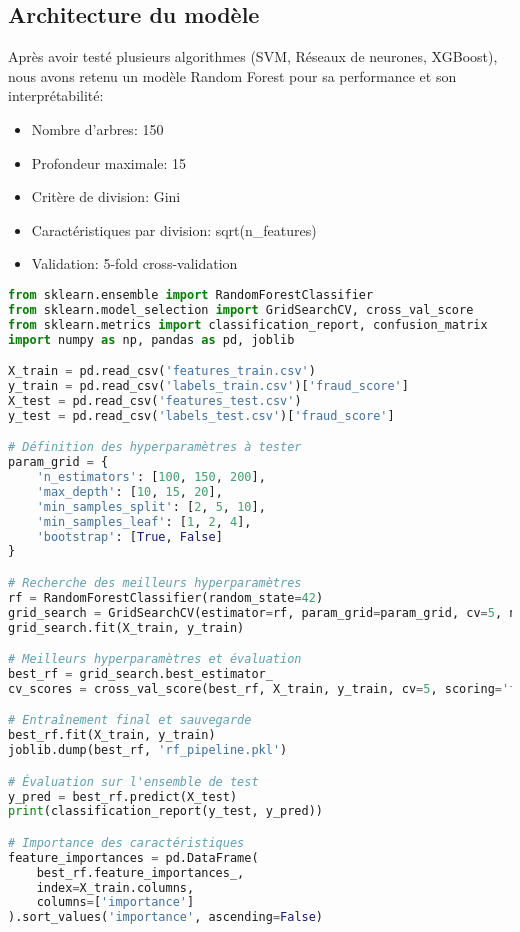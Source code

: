 \documentclass[10pt,a4paper,twocolumn]{article}
\begin{document}
\subsection{Architecture du modèle}
Après avoir testé plusieurs algorithmes (SVM, Réseaux de neurones, XGBoost), nous avons retenu un modèle Random Forest pour sa performance et son interprétabilité:

\begin{itemize}
    \item Nombre d'arbres: 150
    \item Profondeur maximale: 15
    \item Critère de division: Gini
    \item Caractéristiques par division: sqrt(n\_features)
    \item Validation: 5-fold cross-validation
\end{itemize}


\begin{lstlisting}[language=Python,
  caption=Extrait du code de l'outil de scraping,
  basicstyle=\scriptsize,
  breaklines=true,
  postbreak=\mbox{\textcolor{red}{$\hookrightarrow$}\space},
  columns=flexible,
  frame=single,              % active le cadre
  xleftmargin=4em,           % décale le texte à l'intérieur du cadre
  framexleftmargin=2em       % décale le cadre pour qu'il suive le texte
]
from sklearn.ensemble import RandomForestClassifier
from sklearn.model_selection import GridSearchCV, cross_val_score
from sklearn.metrics import classification_report, confusion_matrix
import numpy as np, pandas as pd, joblib

X_train = pd.read_csv('features_train.csv')
y_train = pd.read_csv('labels_train.csv')['fraud_score']
X_test = pd.read_csv('features_test.csv')
y_test = pd.read_csv('labels_test.csv')['fraud_score']

# Définition des hyperparamètres à tester
param_grid = {
    'n_estimators': [100, 150, 200],
    'max_depth': [10, 15, 20],
    'min_samples_split': [2, 5, 10],
    'min_samples_leaf': [1, 2, 4],
    'bootstrap': [True, False]
}

# Recherche des meilleurs hyperparamètres
rf = RandomForestClassifier(random_state=42)
grid_search = GridSearchCV(estimator=rf, param_grid=param_grid, cv=5, n_jobs=-1, scoring='f1')
grid_search.fit(X_train, y_train)

# Meilleurs hyperparamètres et évaluation
best_rf = grid_search.best_estimator_
cv_scores = cross_val_score(best_rf, X_train, y_train, cv=5, scoring='f1')

# Entraînement final et sauvegarde
best_rf.fit(X_train, y_train)
joblib.dump(best_rf, 'rf_pipeline.pkl')

# Évaluation sur l'ensemble de test
y_pred = best_rf.predict(X_test)
print(classification_report(y_test, y_pred))

# Importance des caractéristiques
feature_importances = pd.DataFrame(
    best_rf.feature_importances_,
    index=X_train.columns,
    columns=['importance']
).sort_values('importance', ascending=False)
\end{lstlisting}
\end{document}
